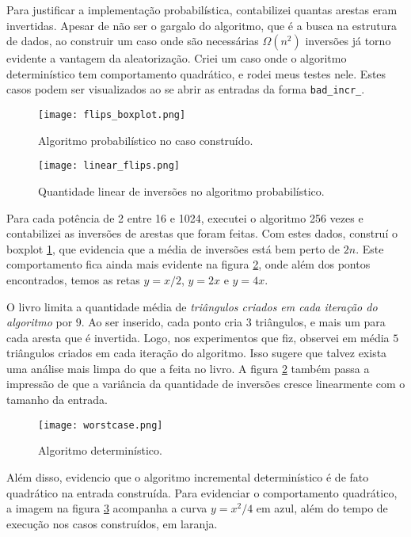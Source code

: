 \documentclass[10pt,reqno,a4paper]{article}
\begin{document}
Para justificar a implementação probabilística, contabilizei quantas arestas eram
invertidas. Apesar de não ser o gargalo do algoritmo, que é a busca na estrutura
de dados, ao construir um caso onde são necessárias $\Omega(n^2)$ inversões já
torno evidente a vantagem da aleatorização. Criei um caso onde o algoritmo
determinístico tem comportamento quadrático, e rodei meus testes nele.
Estes casos podem ser visualizados ao se abrir as entradas da forma
\texttt{bad\_incr\_}.

\begin{figure}[h]
    \centering
    \caption{Algoritmo probabilístico no caso construído.}
    \texttt{[image: flips\_boxplot.png]}
    \label{fig:boxplot}
\end{figure}

\begin{figure}[h]
    \centering
    \caption{Quantidade linear de inversões no algoritmo probabilístico.}
    \texttt{[image: linear\_flips.png]}
    \label{fig:linear_flips}
\end{figure}

Para cada potência de 2 entre 16 e 1024, executei o algoritmo 256 vezes e contabilizei
as inversões de arestas que foram feitas. Com estes dados, construí o boxplot 
\ref{fig:boxplot}, que evidencia que a média de inversões está bem perto de $2n$.
Este comportamento fica ainda mais evidente na figura \ref{fig:linear_flips}, onde
além dos pontos encontrados, temos as retas $y = x/2$, $y = 2x$ e $y = 4x$.

O livro limita a quantidade média de \emph{triângulos criados em cada iteração do algoritmo}
por $9$. Ao ser inserido, cada ponto cria 3 triângulos, e mais um para cada aresta que é
invertida. Logo, nos experimentos que fiz, observei em média $5$ triângulos criados em
cada iteração do algoritmo. Isso sugere que talvez exista uma análise mais limpa do que a
feita no livro. A figura \ref{fig:linear_flips} também passa a impressão de que a variância
da quantidade de inversões cresce linearmente com o tamanho da entrada.

\begin{figure}[h]
    \centering
    \caption{Algoritmo determinístico.}
    \texttt{[image: worstcase.png]}
    \label{fig:quadratic}
\end{figure}

Além disso, evidencio que o algoritmo incremental determinístico é de fato quadrático
na entrada construída. Para evidenciar o comportamento quadrático, a imagem na figura
\ref{fig:quadratic} acompanha a curva $y = x^2/4$ em azul, além do tempo de execução
nos casos construídos, em laranja.

\printbibliography
\end{document}
